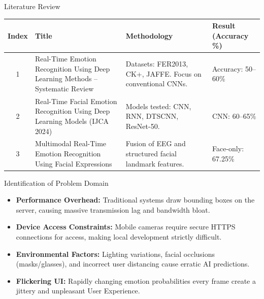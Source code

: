 \documentclass[aspectratio=169]{beamer}
\begin{document}
\begin{frame}{Literature Review}
\scriptsize
\setlength{\tabcolsep}{4pt}
\renewcommand{\arraystretch}{1.5}
\begin{tabularx}{\textwidth}{|c|X|X|X|}
\hline
\rowcolor{blue!10}
\textbf{Index} & \textbf{Title} & \textbf{Methodology} & \textbf{Result (Accuracy \%)} \\ \hline

1 & Real-Time Emotion Recognition Using Deep Learning Methods -- Systematic Review & 
Datasets: FER2013, CK+, JAFFE. Focus on conventional CNNs. & 
Accuracy: 50--60\% \\ \hline

2 & Real-Time Facial Emotion Recognition Using Deep Learning Models (IJCA 2024) & 
Models tested: CNN, RNN, DTSCNN, ResNet-50. & 
CNN: 60--65\% \\ \hline

3 & Multimodal Real-Time Emotion Recognition Using Facial Expressions & 
Fusion of EEG and structured facial landmark features. & 
Face-only: 67.25\% \\ \hline
\end{tabularx}
\end{frame}

\begin{frame}{Identification of Problem Domain}
\begin{itemize}
    \item \textbf{Performance Overhead:} Traditional systems draw bounding boxes on the server, causing massive transmission lag and bandwidth bloat.
    \item \textbf{Device Access Constraints:} Mobile cameras require secure HTTPS connections for access, making local development strictly difficult.
    \item \textbf{Environmental Factors:} Lighting variations, facial occlusions (masks/glasses), and incorrect user distancing cause erratic AI predictions.
    \item \textbf{Flickering UI:} Rapidly changing emotion probabilities every frame create a jittery and unpleasant User Experience.
\end{itemize}
\end{frame}
\end{document}
